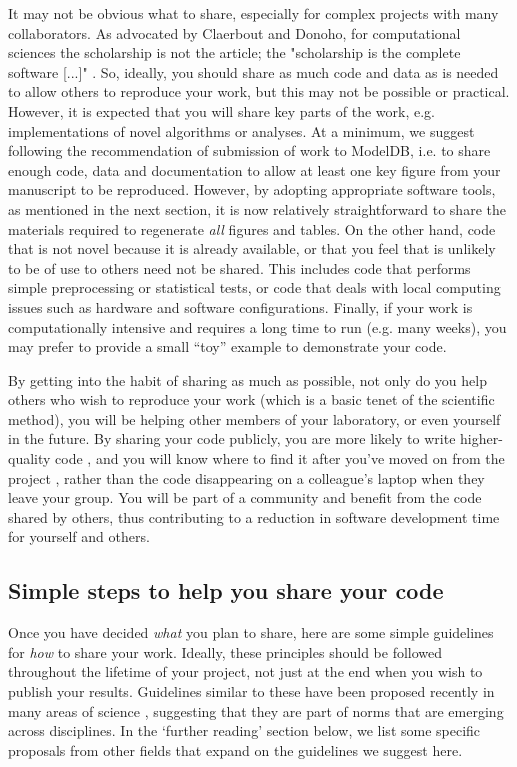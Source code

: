 \documentclass[11pt]{article}
\begin{document}
It may not be obvious what to share, especially for complex projects
with many collaborators.  As advocated by Claerbout and Donoho, for
computational sciences the scholarship is not the article; the
"scholarship is the complete software [...]"
\cite{claerbout_electronic_1992,donoho_invitation_2010}.  So, ideally,
you should share as much code and data as is needed to allow others to
reproduce your work, but this may not be possible or practical.
However, it is expected that you will share key parts of the work,
e.g. implementations of novel algorithms or analyses.  At a minimum,
we suggest following the recommendation of submission of work to
ModelDB\cite{modeldb}, i.e. to share enough code, data and
documentation to allow at least one key figure from your manuscript to
be reproduced.  However, by adopting appropriate software tools, as
mentioned in the next section, it is now relatively straightforward to
share the materials required to regenerate \textit{all} figures and
tables.  On the other hand, code that is not novel because it is
already available, or that you feel that is unlikely to be of use to
others need not be shared.  This includes code that performs simple
preprocessing or statistical tests, or code that deals with local
computing issues such as hardware and software configurations.
Finally, if your work is computationally intensive and requires a long
time to run (e.g. many weeks), you may prefer to provide a small ``toy''
example to demonstrate your code.


By getting into the habit of sharing as much as possible, not only do
you help others who wish to reproduce your work (which is a basic
tenet of the scientific method), you will be helping other members of
your laboratory, or even yourself in the future.  By sharing your code
publicly, you are more likely to write higher-quality code
\cite{Easterbrook2014}, and you will know where to find it after
you've moved on from the project \cite{Halchenko2015}, rather than the
code disappearing on a colleague's laptop when they leave your group.
You will be part of a community and benefit from the code shared by
others, thus contributing to a reduction in software development time
for yourself and others.


\subsection*{Simple steps to help you share your code}

Once you have decided \textit{what} you plan to share, here are some simple 
guidelines for \textit{how} to share your work.  Ideally, these
principles should be followed throughout the lifetime of your project,
not just at the end when you wish to publish your results. Guidelines similar to these have been proposed recently in many areas of science \cite{Nosek2015, miguel2014, stodden2012journals}, suggesting that they are part of norms that are emerging across disciplines. In the `further reading' section below, we list some specific proposals from other fields that expand on the guidelines we suggest here.  
\end{document}
